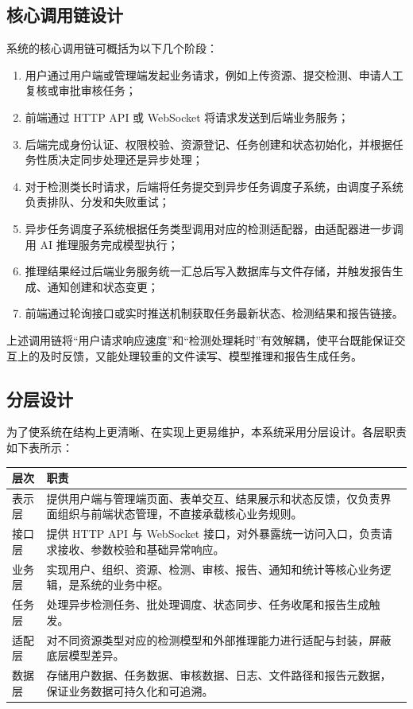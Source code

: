 \subsection{核心调用链设计}
系统的核心调用链可概括为以下几个阶段：
\begin{enumerate}[leftmargin=2em]
    \item 用户通过用户端或管理端发起业务请求，例如上传资源、提交检测、申请人工复核或审批审核任务；
    \item 前端通过 HTTP API 或 WebSocket 将请求发送到后端业务服务；
    \item 后端完成身份认证、权限校验、资源登记、任务创建和状态初始化，并根据任务性质决定同步处理还是异步处理；
    \item 对于检测类长时请求，后端将任务提交到异步任务调度子系统，由调度子系统负责排队、分发和失败重试；
    \item 异步任务调度子系统根据任务类型调用对应的检测适配器，由适配器进一步调用 AI 推理服务完成模型执行；
    \item 推理结果经过后端业务服务统一汇总后写入数据库与文件存储，并触发报告生成、通知创建和状态变更；
    \item 前端通过轮询接口或实时推送机制获取任务最新状态、检测结果和报告链接。
\end{enumerate}

上述调用链将“用户请求响应速度”和“检测处理耗时”有效解耦，使平台既能保证交互上的及时反馈，又能处理较重的文件读写、模型推理和报告生成任务。

\subsection{分层设计}
为了使系统在结构上更清晰、在实现上更易维护，本系统采用分层设计。各层职责如下表所示：
\begin{longtable}{|p{3cm}|p{11cm}|}
\hline
层次 & 职责 \\ \hline
表示层 & 提供用户端与管理端页面、表单交互、结果展示和状态反馈，仅负责界面组织与前端状态管理，不直接承载核心业务规则。\\ \hline
接口层 & 提供 HTTP API 与 WebSocket 接口，对外暴露统一访问入口，负责请求接收、参数校验和基础异常响应。\\ \hline
业务层 & 实现用户、组织、资源、检测、审核、报告、通知和统计等核心业务逻辑，是系统的业务中枢。\\ \hline
任务层 & 处理异步检测任务、批处理调度、状态同步、任务收尾和报告生成触发。\\ \hline
适配层 & 对不同资源类型对应的检测模型和外部推理能力进行适配与封装，屏蔽底层模型差异。\\ \hline
数据层 & 存储用户数据、任务数据、审核数据、日志、文件路径和报告元数据，保证业务数据可持久化和可追溯。\\ \hline
\end{longtable}


